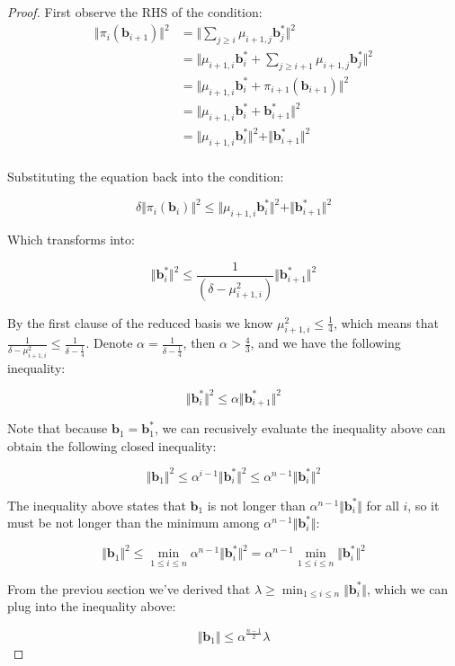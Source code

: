 \begin{proof}
    First observe the RHS of the condition:
    $$
    \begin{aligned}
    \Vert \pi_i(\mathbf{b}_{i+1})\Vert^2 &= \Vert \sum_{j\geq i}\mu_{i+1, j}\mathbf{b}_j^\ast\Vert^2 \\
    &= \Vert \mu_{i+1, i}\mathbf{b}_i^\ast + \sum_{j\geq i+1}\mu_{i+1, j}\mathbf{b}_j^\ast\Vert^2 \\
    &= \Vert \mu_{i+1, i}\mathbf{b}_i^\ast + \pi_{i+1}(\mathbf{b}_{i+1}) \Vert^2 \\
    &= \Vert \mu_{i+1, i}\mathbf{b}_i^\ast + \mathbf{b}_{i+1}^\ast \Vert^2 \\
    &= \Vert \mu_{i+1, i}\mathbf{b}_i^\ast \Vert^2 + \Vert \mathbf{b}_{i+1}^\ast \Vert^2 \\
    \end{aligned}
    $$

    Substituting the equation back into the condition:

    $$
    \delta\Vert \pi_i(\mathbf{b}_i)\Vert^2 \leq \Vert \mu_{i+1, i}\mathbf{b}_i^\ast \Vert^2 + \Vert \mathbf{b}_{i+1}^\ast \Vert^2
    $$

    Which transforms into:

    $$
    \Vert \mathbf{b}_i^\ast \Vert^2 \leq \frac{1}{(\delta - \mu_{i+1, i}^2)} \Vert \mathbf{b}_{i+1}^\ast \Vert^2
    $$

    By the first clause of the reduced basis we know $\mu_{i+1, i}^2 \leq \frac{1}{4}$, which means that $\frac{1}{\delta - \mu_{i+1, i}^2} \leq \frac{1}{\delta - \frac{1}{4}}$. Denote $\alpha = \frac{1}{\delta - \frac{1}{4}}$, then $\alpha > \frac{4}{3}$, and we have the following inequality:

    $$
    \Vert \mathbf{b}_i^\ast \Vert^2 \leq \alpha \Vert \mathbf{b}_{i+1}^\ast \Vert^2
    $$

    Note that because $\mathbf{b}_1 = \mathbf{b}_1^\ast$, we can recusively evaluate the inequality above can obtain the following closed inequality:

    $$
    \Vert \mathbf{b}_1 \Vert^2 \leq \alpha^{i-1} \Vert \mathbf{b}_{i}^\ast \Vert^2 \leq \alpha^{n-1} \Vert \mathbf{b}_{i}^\ast \Vert^2
    $$

    The inequality above states that $\mathbf{b}_1$ is not longer than $\alpha^{n-1} \Vert \mathbf{b}_{i}^\ast \Vert$ for all $i$, so it must be not longer than the minimum among $\alpha^{n-1} \Vert \mathbf{b}_{i}^\ast \Vert$:

    $$
    \Vert \mathbf{b}_1 \Vert^2 \leq \min_{1 \leq i \leq n}\alpha^{n-1} \Vert \mathbf{b}_{i}^\ast \Vert^2 = \alpha^{n-1} \min_{1 \leq i \leq n}\Vert \mathbf{b}_{i}^\ast \Vert^2
    $$

    From the previou section we've derived that $\lambda \geq \min_{1 \leq i \leq n} \Vert \mathbf{b}_i^\ast \Vert$, which we can plug into the inequality above:

    $$
    \Vert \mathbf{b}_1 \Vert \leq \alpha^\frac{n-1}{2} \lambda
    $$
\end{proof}


